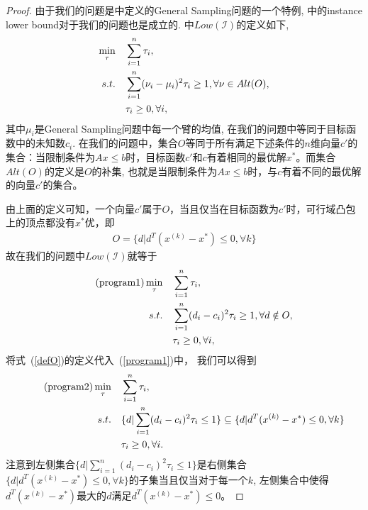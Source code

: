 \begin{proof}
由于我们的问题是\cite{WJMZBMR}中定义的General Sampling问题的一个特例, \cite{WJMZBMR}中的instance lower bound对于我们的问题也是成立的. \cite{WJMZBMR}中$Low(\mathcal{I})$的定义如下,
 \begin{align}
        \label{LowGeneral} \min_\tau \quad & \sum_{i=1}^n \tau_i, \\
        s.t.\quad & \sum_{i=1}^n (\nu_i-\mu_i)^2 \tau_i \ge 1, \forall \nu \in Alt(O), \notag\\
         &\tau_i\ge 0, \forall i, \notag
 \end{align}
 其中$\mu_i$是General Sampling问题中每一个臂的均值, 在我们的问题中等同于目标函数中的未知数$c_i$. 在我们的问题中，集合$O$等同于所有满足下述条件的$n$维向量$c'$的集合：当限制条件为$Ax\le b$时，目标函数$c'$和$c$有着相同的最优解$x^*$。而集合$Alt(O)$的定义是$O$的补集, 也就是当限制条件为$Ax\le b$时，与$c$有着不同的最优解的向量$c'$的集合。 
 
由上面的定义可知，一个向量$c'$属于$O$，当且仅当在目标函数为$c'$时，可行域凸包上的顶点都没有$x^*$优，即
 \begin{align} 
\label{defO} O = \{ d| d^T (x^{(k)} - x^*) \le 0, \forall k\} 
 \end{align}
 故在我们的问题中$Low(\mathcal{I})$就等于
 \begin{align} 
   \tag{program1}      \min_\tau \quad & \sum_{i=1}^n \tau_i, \\
        s.t.\quad & \sum_{i=1}^n (d_i-c_i)^2 \tau_i \ge 1, \forall d \notin O, \notag\\
         &\tau_i\ge 0, \forall i, \notag
 \end{align}
 将式~(\ref{defO})的定义代入~(\ref{program1})中， 我们可以得到
 \begin{align}
     \tag{program2}    \min_\tau \quad & \sum_{i=1}^n \tau_i,\\
        s.t.\quad & \{ d | \sum_{i=1}^n (d_i-c_i)^2 \tau_i \le 1\} \subseteq \{ d| d^T (x^{(k)} - x^*) \le 0, \forall k\} \notag \\
         &\tau_i\ge 0, \forall i. \notag
 \end{align}
 注意到左侧集合$\{ d | \sum_{i=1}^n (d_i-c_i)^2 \tau_i \le 1\}$是右侧集合$\{ d| d^T (x^{(k)} - x^*) \le 0, \forall k\}$的子集当且仅当对于每一个$k$, 左侧集合中使得$d^T (x^{(k)} - x^*)$最大的$d$满足$d^T (x^{(k)} - x^*) \le 0$。
 

\end{proof}
